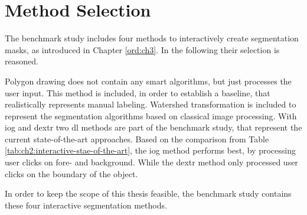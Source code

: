 
\section{Method Selection}\label{ord:ch4:sec2}

The benchmark study includes four methods to interactively create segmentation masks, as introduced in Chapter \ref{ord:ch3}. 
In the following their selection is reasoned.

Polygon drawing does not contain any smart algorithms, but just processes the user input.
This method is included, in order to establish a baseline, that realistically represents manual labeling.
Watershed transformation is included to represent the segmentation algorithms based on classical image processing.
With \gls{iog} and \gls{dextr} two \gls{dl} methods are part of the benchmark study, that represent the current state-of-the-art approaches.
Based on the comparison from Table \ref{tab:ch2:interactive-stae-of-the-art}, the \gls{iog} method performs best, by processing user clicks on fore- and background.
While the \gls{dextr} method only processed user clicks on the boundary of the object.

In order to keep the scope of this thesis feasible, the benchmark study contains these four interactive segmentation methods.
